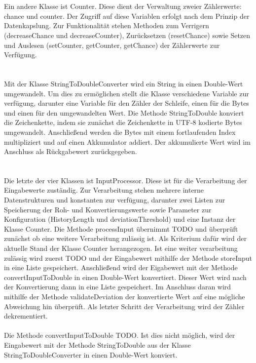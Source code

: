 \documentclass{article}
\begin{document}
    \\
    \\
    Ein andere Klasse ist Counter.
    Diese dient der Verwaltung zweier Zählerwerte: chance und counter.
    Der Zugriff auf diese Variablen erfolgt nach dem Prinzip der Datenkapslung.
    Zur Funktionalität stehen Methoden zum Verrigern (decreaseChance und decreaseCounter), Zurücksetzen (resetChance) sowie Setzen und Auslesen (setCounter, getCounter, getChance) der Zählerwerte zur Verfügung.\\
    \\
    \\
    Mit der Klasse StringToDoubleConverter wird ein String in einen Double-Wert umgewandelt.
    Um dies zu ermöglichen stellt die Klasse verschiedene Variable zur verfügung, darunter eine Variable für den Zähler der Schleife, einen für die Bytes und einen für den umgewandelten Wert.
    Die Methode StringToDouble konviert die Zeichenkette, indem sie zunächst die Zeichenkette in UTF-8 kodierte Bytes umgewandelt.
    Anschließend werden die Bytes mit einem fortlaufenden Index multipliziert und auf einen Akkumulator addiert.
    Der akkumulierte Wert wird im Anschluss als Rückgabewert zurückgegeben.\\
    \\
    \\
    Die letzte der vier Klassen ist InputProcessor.
    Diese ist für die Verarbeitung der Eingabewerte zuständig.
    Zur Verarbeitung stehen mehrere interne Datenstrukturen und konstanten zur verfügung, darunter zwei Listen zur Speicherung der Roh- und Konvertierungswerte sowie Parameter zur Konfiguration (HistoryLength und deviationThreshold) und eine Instanz der Klasse Counter.
    Die Methode processInput übernimmt TODO und überprüft zunächst ob eine weitere Verarbeitung zulässig ist. 
    Als Kriterium dafür wird der aktuelle Stand der Klasse Counter herangezogen.
    Ist eine weiter verarbeitung zulässig wird zuerst TODO und der Eingabewert mithilfe der Methode storeInput in eine Liste gespeichert.
    Anschließend wird der Eigabewert mit der Methode convertInputToDouble in einen Double-Wert konvertiert.
    Dieser Wert wird nach der Konvertierung dann in eine Liste gespeichert.
    Im Anschluss daran wird mithilfe der Methode validateDeviation der konvertierte Wert auf eine mögliche Abweichung hin überprüft.
    Als letzter Schritt der Verarbeitung wird der Zähler dekrementiert.\\
    \\
    Die Methode convertInputToDouble TODO. Ist dies nicht möglich, wird der Eingabewert mit der Methode StringToDouble aus der Klasse StringToDoubleConverter in einen Double-Wert konviert.
\end{document}
